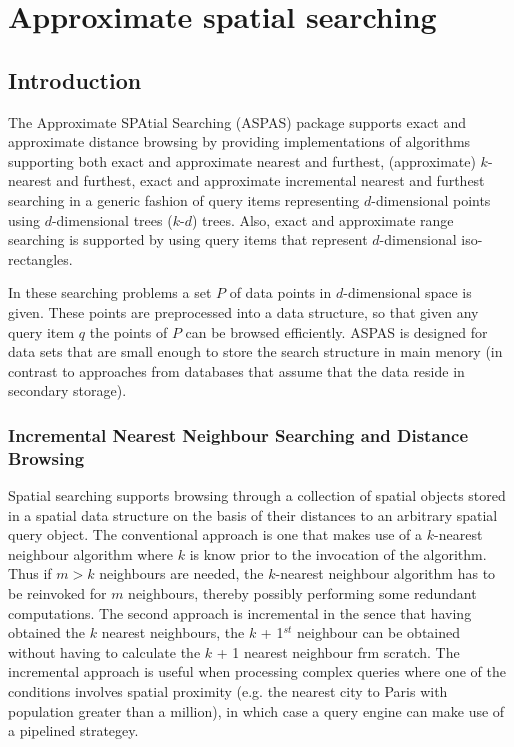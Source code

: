 \chapter{Approximate spatial searching}

\section{Introduction}

The Approximate SPAtial Searching (ASPAS) package supports
exact and approximate distance browsing
by providing implementations of algorithms supporting both exact and
approximate nearest and furthest, (approximate) $k$-nearest and furthest,
exact and approximate incremental nearest
and furthest searching in a generic fashion of query items
representing $d$-dimensional
points using $d$-dimensional trees
($k$-$d$) trees.
Also, exact and approximate range searching is
supported by using query items that represent
$d$-dimensional iso-rectangles.

In these searching problems a set $P$ of data points in $d$-dimensional
space is given.
These points are preprocessed into a data structure, so that given
any query item $q$ the points of $P$ can be browsed efficiently.
ASPAS is designed for data sets that are small enough to store
the search structure in main menory (in contrast to approaches
from databases that assume that the data reside in secondary storage).

\subsection{Incremental Nearest Neighbour Searching and Distance Browsing}

Spatial searching supports browsing through a collection of spatial objects
stored in a spatial data structure on the basis of their distances to an arbitrary spatial
query object. The conventional approach is one that makes use of a $k$-nearest neighbour
algorithm where $k$ is know prior to the invocation of the algorithm.
Thus if $m>k$ neighbours are needed, the $k$-nearest neighbour algorithm has to be
reinvoked for $m$ neighbours, thereby possibly performing some redundant computations.
The second approach is incremental in the sence that having obtained
the $k$ nearest neighbours, the $k$ + 1$^{st}$ neighbour can be obtained without
having to calculate the $k$ + 1 nearest neighbour frm scratch.
The incremental approach is useful when processing complex queries where
one of the conditions involves spatial proximity (e.g. the nearest city to Paris with
population greater than a million), in which case a query engine can make use of
a pipelined strategey.

